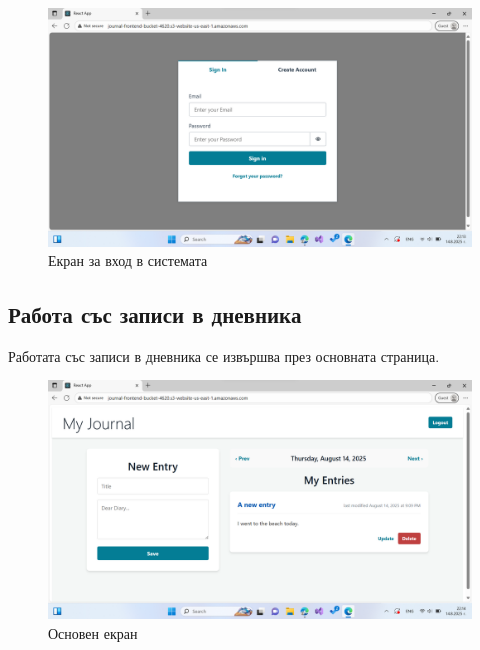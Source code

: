 \documentclass[12pt]{article}
\begin{document}
\begin{figure}[H]
    \centering
    \includegraphics[scale=0.4]{sign_in.png}
    \caption{Екран за вход в системата}
\end{figure}

\subsection{Работа със записи в дневника}
Работата със записи в дневника се извършва през основната страница.

\begin{figure}[H]
    \centering
    \includegraphics[scale=0.4]{main_page.png}
    \caption{Основен екран}
\end{figure}
\end{document}
